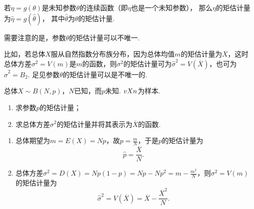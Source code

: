 \begin{theorem}
若\(\eta = g(\theta)\)是未知参数\(\theta\)的连续函数（即\(\eta\)也是一个未知参数），%
那么\(\eta\)的矩估计量为\(\hat{\eta}=g(\hat{\theta})\)，%
其中\(\hat{\theta}\)为\(\theta\)的矩估计量.
\end{theorem}

需要注意的是，参数\(\theta\)的矩估计量可以不唯一.

比如，若总体\(X\)服从自然指数分布族分布，因为总体均值\(m\)的矩估计量为\(\overline{X}\)，这时总体方差\(\sigma^2 = V(m)\)是\(m\)的函数，则\(\sigma^2\)的矩估计量可为\(\hat{\sigma}^2 = V(\overline{X})\)，也可为\(\hat{\sigma}^2 = B_2\).
足见参数\(\theta\)的矩估计量可以是不唯一的.

\begin{example}
总体\(X \sim B(N,p)\)，\(N\)已知，而\(p\)未知.
\(v{X}{n}\)为样本.
\begin{enumerate}
\item 求参数\(p\)的矩估计量；
\item 求总体方差\(\sigma^2\)的矩估计量并将其表示为\(\overline{X}\)的函数.
\end{enumerate}
\begin{solution}
\begin{enumerate}
\item 总体期望为\(m=E(X)=Np\)，故\(p=\frac{m}{N}\)，于是\(p\)的矩估计量为\[
\hat{p}=\frac{\overline{X}}{N}.
\]
\item 总体方差\(\sigma^2=D(X)=Np(1-p)=Np-Np^2=m-\frac{m^2}{N}\)，则\(\sigma^2=V(m)\)的矩估计量为\[
\hat{\sigma}^2=V(\overline{X})=\overline{X}-\frac{\overline{X}^2}{N}.
\]
\end{enumerate}
\end{solution}
\end{example}

